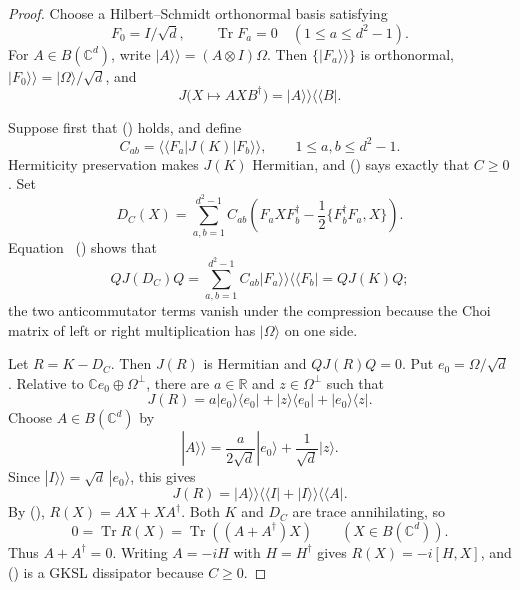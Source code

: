 \documentclass[twoside,10pt]{article}
\numberwithin{equation}{section}
\theoremstyle{slbody}
\theoremstyle{definition}
\theoremstyle{remark}
\newcommand{\Tr}{\operatorname{Tr}}
\renewcommand{\eqref}[1]{%
  \textup{{\normalfont(\oldstylenums{\ref{#1}}}\normalfont)}}
\begin{document}
\begin{proof}
Choose a Hilbert--Schmidt orthonormal basis satisfying
\begin{equation*}
 F_0=I/\sqrt d,\qquad \Tr F_a=0\quad(1\leq a\leq d^2-1).
\end{equation*}
For \(A\in B(\mathbb C^d)\), write
\(|A\rangle\!\rangle=(A\otimes I)\Omega\).  Then
\(\{|F_a\rangle\!\rangle\}\) is orthonormal,
\(|F_0\rangle\!\rangle=|\Omega\rangle/\sqrt d\), and
\begin{equation}\label{eq:elementary-choi-vectorization}
 J\bigl(X\mapsto AXB^\dagger\bigr)
 =|A\rangle\!\rangle\langle\!\langle B|.
\end{equation}

Suppose first that \eqref{eq:compressed-choi-condition} holds, and
define
\begin{equation*}
 C_{ab}=\langle\!\langle F_a|J(K)|F_b\rangle\!\rangle,
 \qquad 1\leq a,b\leq d^2-1.
\end{equation*}
Hermiticity preservation makes \(J(K)\) Hermitian, and
\eqref{eq:compressed-choi-condition} says exactly that \(C\geq0\).
Set
\begin{equation}\label{eq:compressed-choi-dissipator}
 D_C(X)=\sum_{a,b=1}^{d^2-1}C_{ab}
 \left(F_aXF_b^\dagger-\frac12\{F_b^\dagger F_a,X\}\right).
\end{equation}
Equation~\eqref{eq:elementary-choi-vectorization} shows that
\begin{equation*}
 QJ(D_C)Q
 =\sum_{a,b=1}^{d^2-1}C_{ab}
   |F_a\rangle\!\rangle\langle\!\langle F_b|
 =QJ(K)Q;
\end{equation*}
the two anticommutator terms vanish under the compression because the
Choi matrix of left or right multiplication has
\(|\Omega\rangle\) on one side.

Let \(R=K-D_C\).  Then \(J(R)\) is Hermitian and \(QJ(R)Q=0\).
Put \(e_0=\Omega/\sqrt d\).  Relative to
\(\mathbb Ce_0\oplus\Omega^\perp\), there are \(a\in\mathbb R\) and
\(z\in\Omega^\perp\) such that
\begin{equation*}
 J(R)=a|e_0\rangle\langle e_0|
      +|z\rangle\langle e_0|+|e_0\rangle\langle z|.
\end{equation*}
Choose \(A\in B(\mathbb C^d)\) by
\begin{equation*}
 |A\rangle\!\rangle=\frac{a}{2\sqrt d}|e_0\rangle
                      +\frac1{\sqrt d}|z\rangle.
\end{equation*}
Since \(|I\rangle\!\rangle=\sqrt d\,|e_0\rangle\), this gives
\begin{equation*}
 J(R)=|A\rangle\!\rangle\langle\!\langle I|
      +|I\rangle\!\rangle\langle\!\langle A|.
\end{equation*}
By \eqref{eq:elementary-choi-vectorization},
\(R(X)=AX+XA^\dagger\).  Both \(K\) and \(D_C\) are trace
annihilating, so
\begin{equation*}
 0=\Tr R(X)=\Tr((A+A^\dagger)X)\qquad(X\in B(\mathbb C^d)).
\end{equation*}
Thus \(A+A^\dagger=0\).  Writing \(A=-iH\) with \(H=H^\dagger\)
gives \(R(X)=-i[H,X]\), and
\eqref{eq:compressed-choi-dissipator} is a GKSL dissipator because
\(C\geq0\).


\end{proof}
\end{document}
